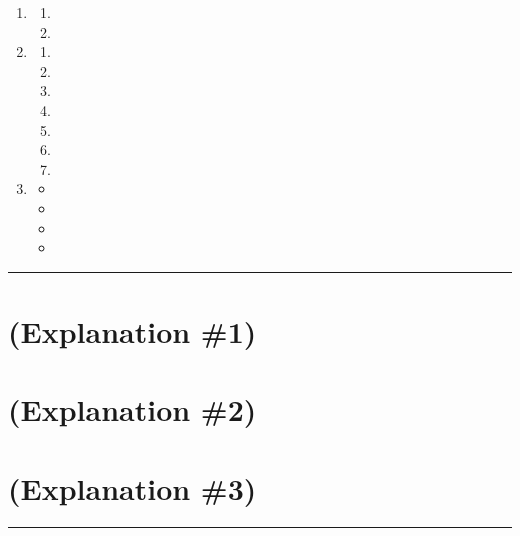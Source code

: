 \documentclass[draft]{report}
\providecommand{\tightlist}{%
  \setlength{\itemsep}{0pt}\setlength{\parskip}{0pt}}
\newenvironment{expl}[0]%
  {\rule{\textwidth}{.2pt}\footnotesize}%
  {\rule{\textwidth}{.2pt}\normalsize}
\begin{document}
\begin{enumerate}
\item

  \begin{enumerate}
  \item
  
  \item
  
  \end{enumerate}
\item

  \begin{enumerate}
  \item
  
  \item
  
  \item
  
  \item
  
  \item
  
  \item
  
  \item
  
  \end{enumerate}
\item

  \begin{itemize}
  \tightlist
  \item
  
  \item
  
  \item
  
  \item
  
  \end{itemize}
\end{enumerate}

\begin{expl}
\section{(Explanation \#1)}\label{explanation-1}


\section{(Explanation \#2)}\label{explanation-2}


\section{(Explanation \#3)}\label{explanation-3}

\end{expl}

\end{document}
